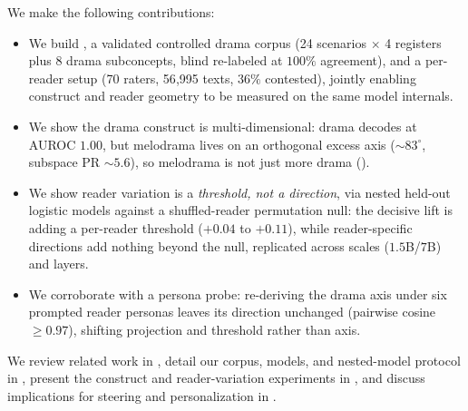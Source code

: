  We make the following contributions:
\begin{itemize}[leftmargin=*,itemsep=0pt,topsep=0pt]
\item We build \dramacorpus, a validated controlled drama corpus (24 scenarios $\times$ 4 registers plus 8 drama subconcepts, blind re-labeled at $100\%$ agreement), and a per-reader \goemotions setup (70 raters, 56{,}995 texts, $36\%$ contested), jointly enabling construct and reader geometry to be measured on the same model internals.
\item We show the drama construct is multi-dimensional: drama decodes at AUROC $1.00$, but melodrama lives on an orthogonal excess axis ($\sim\!83^\circ$, subspace PR $\sim\!5.6$), so melodrama is not just more drama ().
\item We show reader variation is a \emph{threshold, not a direction}, via nested held-out logistic models against a shuffled-reader permutation null: the decisive lift is adding a per-reader threshold ($+0.04$ to $+0.11$), while reader-specific directions add nothing beyond the null, replicated across scales ($1.5$B/$7$B) and layers.
\item We corroborate with a persona probe: re-deriving the drama axis under six prompted reader personas leaves its direction unchanged (pairwise cosine $\geq 0.97$), shifting projection and threshold rather than axis.
\end{itemize}

We review related work in , detail our corpus, models, and nested-model protocol in , present the construct and reader-variation experiments in , and discuss implications for steering and personalization in .
